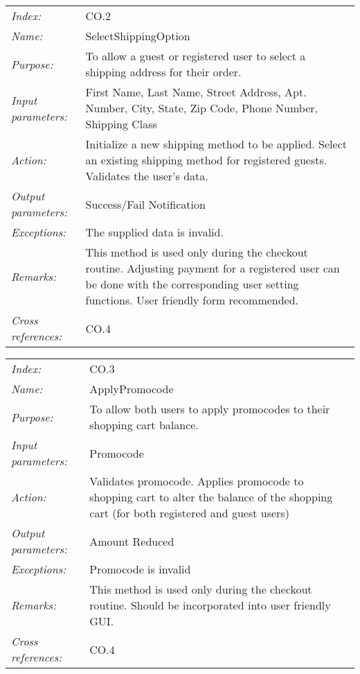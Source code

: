\documentclass[10pt,letter]{article}
\begin{document}
\begin{tabularx}{\textwidth}{l X}
    \it{Index:} & CO.2 \\
    \it{Name:} & SelectShippingOption \\
    \it{Purpose:} & To allow a guest or registered user to select a shipping address for their order.\\
    \it{Input parameters:} & First Name, Last Name, Street Address, Apt. Number, City, State, Zip Code, Phone Number, Shipping Class \\
    \it{Action:} & Initialize a new shipping method to be applied. Select an existing shipping method for registered guests. Validates the user's data.\\
    \it{Output parameters:} & Success/Fail Notification  \\
    \it{Exceptions:} & The supplied data is invalid. \\
    \it{Remarks:} & This method is used only during the checkout routine. Adjusting payment for a registered user can be done with the corresponding user setting functions. User friendly form recommended. \\
    \it{Cross references:} & CO.4\\
    \hline
\end{tabularx}

\begin{tabularx}{\textwidth}{l X}
    \it{Index:} & CO.3 \\
    \it{Name:} & ApplyPromocode \\
    \it{Purpose:} & To allow both users to apply promocodes to their shopping cart balance. \\
    \it{Input parameters:} & Promocode \\
    \it{Action:} & Validates promocode. Applies promocode to shopping cart to alter the balance of the shopping cart (for both registered and guest users)\\
    \it{Output parameters:} & Amount Reduced  \\
    \it{Exceptions:} & Promocode is invalid\\
    \it{Remarks:} & This method is used only during the checkout routine. Should be incorporated into user friendly GUI.\\
    \it{Cross references:} & CO.4 \\
    \hline
\end{tabularx}
\end{document}
